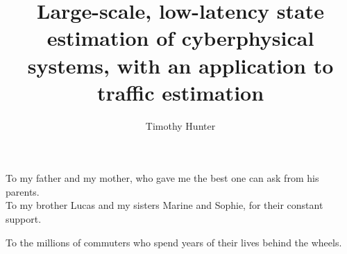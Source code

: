 \documentclass{ucbthesis}
\begin{document}

\title{Large-scale, low-latency state estimation of cyberphysical systems, with an application to traffic estimation}
\author{Timothy Hunter}




\maketitle
\approvalpage
\copyrightpage



\begin{frontmatter}

\begin{dedication}
\null\vfil
\begin{center}
To my father and my mother, who gave me the best one can ask from his parents.\\

To my brother Lucas and my sisters Marine and Sophie, for their constant support.\\\vspace{12pt}

To the millions of commuters who spend years of their lives behind the wheels.\\\vspace{12pt}
\end{center}
\vfil\null
\end{dedication}

\tableofcontents
\clearpage
\listoffigures
\clearpage
\listofalgorithms

\begin{acknowledgements}

\end{acknowledgements}

\end{frontmatter}
\end{document}
